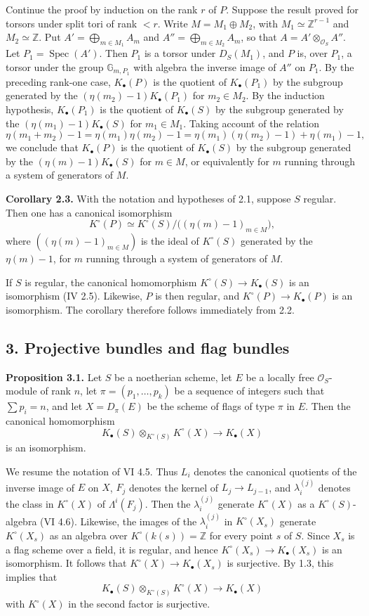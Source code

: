 \documentclass[11pt]{article}
\newcommand{\Spec}{\operatorname{Spec}}
\begin{document}
Continue the proof by induction on the rank $r$ of $P$. Suppose the result proved for torsors under split tori of rank $<r$. Write $M=M_1\oplus M_2$, with $M_1\simeq\mathbb Z^{r-1}$ and $M_2\simeq\mathbb Z$. Put $A'=\bigoplus_{m\in M_1}A_m$ and $A''=\bigoplus_{m\in M_2}A_m$, so that $A=A'\otimes_{\mathcal O_S}A''$.
Let $P_1=\Spec(A')$. Then $P_1$ is a torsor under $D_S(M_1)$, and $P$ is, over $P_1$, a torsor under the group $\mathbb G_{m,P_1}$ with algebra the inverse image of $A''$ on $P_1$. By the preceding rank-one case, $K_\bullet(P)$ is the quotient of $K_\bullet(P_1)$ by the subgroup generated by the $(\eta(m_2)-1)K_\bullet(P_1)$ for $m_2\in M_2$. By the induction hypothesis, $K_\bullet(P_1)$ is the quotient of $K_\bullet(S)$ by the subgroup generated by the $(\eta(m_1)-1)K_\bullet(S)$ for $m_1\in M_1$. Taking account of the relation
\[
 \eta(m_1+m_2)-1=\eta(m_1)\eta(m_2)-1
 =\eta(m_1)(\eta(m_2)-1)+\eta(m_1)-1,
\]
we conclude that $K_\bullet(P)$ is the quotient of $K_\bullet(S)$ by the subgroup generated by the $(\eta(m)-1)K_\bullet(S)$ for $m\in M$, or equivalently for $m$ running through a system of generators of $M$.

\textbf{Corollary 2.3.} With the notation and hypotheses of 2.1, suppose $S$ regular. Then one has a canonical isomorphism
\[
 K^\circ(P)\simeq K^\circ(S)/\bigl((\eta(m)-1)_{m\in M}\bigr),
\]
where $((\eta(m)-1)_{m\in M})$ is the ideal of $K^\circ(S)$ generated by the $\eta(m)-1$, for $m$ running through a system of generators of $M$.

If $S$ is regular, the canonical homomorphism $K^\circ(S)\to K_\bullet(S)$ is an isomorphism (IV 2.5). Likewise, $P$ is then regular, and $K^\circ(P)\to K_\bullet(P)$ is an isomorphism. The corollary therefore follows immediately from 2.2.

\subsection*{3. Projective bundles and flag bundles}

\textbf{Proposition 3.1.} Let $S$ be a noetherian scheme, let $E$ be a locally free $\mathcal O_S$-module of rank $n$, let $\pi=(p_1,\ldots,p_k)$ be a sequence of integers such that $\sum p_i=n$, and let $X=D_\pi(E)$ be the scheme of flags of type $\pi$ in $E$. Then the canonical homomorphism
\[
 K_\bullet(S)\otimes_{K^\circ(S)}K^\circ(X)\longrightarrow K_\bullet(X)
\]
is an isomorphism.

We resume the notation of VI 4.5. Thus $L_i$ denotes the canonical quotients of the inverse image of $E$ on $X$, $F_j$ denotes the kernel of $L_j\to L_{j-1}$, and $\lambda_i^{(j)}$ denotes the class in $K^\circ(X)$ of $\Lambda^i(F_j)$. Then the $\lambda_i^{(j)}$ generate $K^\circ(X)$ as a $K^\circ(S)$-algebra (VI 4.6). Likewise, the images of the $\lambda_i^{(j)}$ in $K^\circ(X_s)$ generate $K^\circ(X_s)$ as an algebra over $K^\circ(k(s))=\mathbb Z$ for every point $s$ of $S$. Since $X_s$ is a flag scheme over a field, it is regular, and hence $K^\circ(X_s)\to K_\bullet(X_s)$ is an isomorphism. It follows that $K^\circ(X)\to K_\bullet(X_s)$ is surjective. By 1.3, this implies that
\[
 K_\bullet(S)\otimes_{K^\circ(S)}K^\circ(X)\longrightarrow K_\bullet(X)
\]
with $K^\circ(X)$ in the second factor is surjective.
\end{document}
